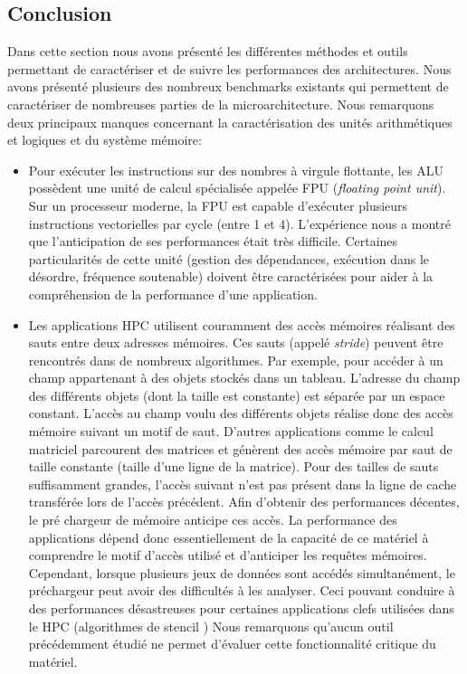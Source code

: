\subsection{Conclusion} \label{sec:edl_hc_conclusion} \label{sec:edl_perf_conclusion}

    Dans cette section nous avons présenté les différentes méthodes et outils permettant de caractériser et de suivre les performances des architectures.  Nous avons présenté plusieurs des nombreux \glspl{benchmark} existants qui permettent de caractériser de nombreuses parties de la microarchitecture. Nous remarquons deux principaux manques concernant la caractérisation des unités arithmétiques et logiques et du système mémoire:
       \begin{itemize}
           \item Pour exécuter les instructions sur des nombres à virgule flottante, les ALU possèdent une unité de calcul spécialisée appelée FPU (\textit{floating point unit}). Sur un processeur moderne, la FPU est capable d'exécuter plusieurs instructions vectorielles par cycle (entre 1 et 4). L'expérience nous a montré que l'anticipation de ses performances était très difficile. Certaines particularités de cette unité (gestion des dépendances, exécution dans le désordre, fréquence soutenable) doivent être caractérisées pour aider à la compréhension de la performance d'une application. 
           
           \item Les applications \gls{HPC} utilisent couramment des accès mémoires réalisant des sauts entre deux adresses mémoires. Ces sauts (appelé \textit{stride}) peuvent être rencontrés dans de nombreux algorithmes. Par exemple, pour accéder à un champ appartenant à des objets stockés dans un tableau. L'adresse du champ des différents objets (dont la taille est constante) est séparée par un espace constant. L'accès au champ voulu des différents objets réalise donc des accès mémoire suivant un motif de saut. D’autres applications comme le calcul matriciel parcourent des matrices et génèrent des accès mémoire par saut de taille constante (taille d’une ligne de la matrice). Pour des tailles de sauts suffisamment grandes, l'accès suivant n'est pas présent dans la ligne de cache transférée lors de l'accès précédent. Afin d'obtenir des performances décentes, le pré chargeur de mémoire anticipe ces accès. La performance des applications dépend donc essentiellement de la capacité de ce matériel à comprendre le motif d'accès utilisé et d'anticiper les requêtes mémoires. Cependant, lorsque plusieurs jeux de données sont accédés simultanément, le préchargeur peut avoir des difficultés à les analyser. Ceci pouvant conduire à des performances désastreuses pour certaines applications clefs utilisées dans le HPC (algorithmes de stencil \cite{datta2008stencil}) Nous remarquons qu'aucun outil précédemment étudié ne permet d'évaluer cette fonctionnalité critique du matériel. 
       \end{itemize}
   
